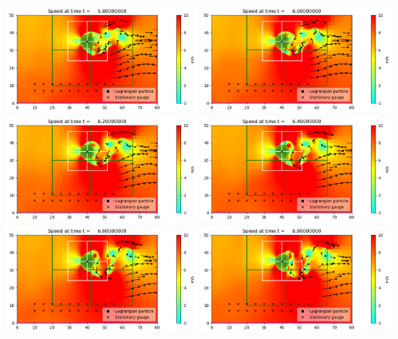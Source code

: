\documentclass[11pt]{article}
\begin{document}
\vskip 10pt 
\includegraphics[width=0.475\textwidth]{frame0029fig0.png}
\vskip 10pt 
\includegraphics[width=0.475\textwidth]{frame0030fig0.png}
\vskip 10pt 
\includegraphics[width=0.475\textwidth]{frame0031fig0.png}
\vskip 10pt 
\includegraphics[width=0.475\textwidth]{frame0032fig0.png}
\vskip 10pt 
\includegraphics[width=0.475\textwidth]{frame0033fig0.png}
\vskip 10pt 
\includegraphics[width=0.475\textwidth]{frame0034fig0.png}
\end{document}
